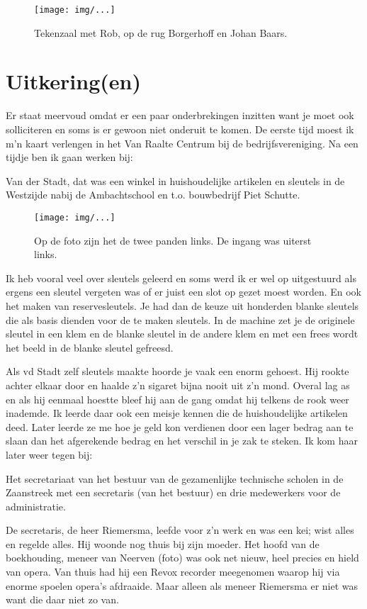 \documentclass[10pt,twoside,openright]{memoir}
\begin{document}
\begin{figure}[t]
\texttt{[image: img/...]}
\caption{Tekenzaal met Rob, op de rug Borgerhoff en Johan Baars.}
\end{figure}

\chapter{Uitkering(en)} %
\label{cha:uitkering_en}

Er staat meervoud omdat er een paar onderbrekingen inzitten want je moet ook solliciteren en soms is er gewoon niet onderuit te komen. De eerste tijd moest ik m'n kaart verlengen in het Van Raalte Centrum bij de bedrijfsvereniging. Na een tijdje ben ik gaan werken bij:

Van der Stadt, dat was een winkel in huishoudelijke artikelen en sleutels in de Westzijde nabij de Ambachtschool en t.o. bouwbedrijf Piet Schutte.

\begin{figure}[t]
\texttt{[image: img/...]}
\caption{Op de foto zijn het de twee panden links. De ingang was uiterst links.}
\end{figure}

Ik heb vooral veel over sleutels geleerd en soms werd ik er wel op uitgestuurd als ergens een sleutel vergeten was of er juist een slot op gezet moest worden. En ook het maken van reservesleutels. Je had dan de keuze uit honderden blanke sleutels die als basis dienden voor de te maken sleutels. In de machine zet je de originele sleutel in een klem en de blanke sleutel in de andere klem en met een frees wordt het beeld in de blanke sleutel gefreesd. 

Als vd Stadt zelf sleutels maakte hoorde je vaak een enorm gehoest. Hij rookte achter elkaar door en haalde z’n sigaret bijna nooit uit z’n mond. Overal lag as en als hij eenmaal hoestte bleef hij aan de gang omdat hij telkens de rook weer inademde. Ik leerde daar ook een meisje kennen die de huishoudelijke artikelen deed. Later leerde ze me hoe je geld kon verdienen door een lager bedrag aan te slaan dan het afgerekende bedrag en het verschil in je zak te steken. Ik kom haar later weer tegen bij: 

Het secretariaat van het bestuur van de gezamenlijke technische scholen in de Zaanstreek met een secretaris (van het bestuur) en drie medewerkers voor de administratie. 

De secretaris, de heer Riemersma, leefde voor z'n werk en was een kei; wist alles en regelde alles. Hij woonde nog thuis bij zijn moeder. Het hoofd van de boekhouding, meneer van Neerven (foto) was ook net nieuw, heel precies en hield van opera. Van thuis had hij een Revox recorder meegenomen waarop hij via enorme spoelen opera's afdraaide. Maar alleen als meneer Riemersma er niet was want die daar niet zo van.
\end{document}
